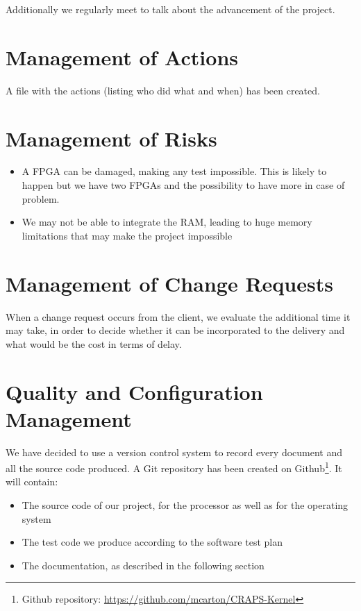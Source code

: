 \documentclass{article}
\begin{document}
    Additionally we regularly meet to talk about the advancement of the project.

  \section{Management of Actions}
    A file with the actions (listing who did what and when) has been created.

  \section{Management of Risks}
    \begin{itemize}
      \item A FPGA can be damaged, making any test impossible. This is likely to
          happen but we have two FPGAs and the possibility to have more in case
          of problem.
      \item We may not be able to integrate the RAM, leading to huge memory
          limitations that may make the project impossible
    \end{itemize}

  \section{Management of Change Requests}
    When a change request occurs from the client, we evaluate the additional
    time it may take, in order to decide whether it can be incorporated to the
    delivery and what would be the cost in terms of delay.

  \section{Quality and Configuration Management}
    We have decided to use a version control system to record every document and
    all the source code produced. A Git repository has been created on
    Github\footnote{Github repository:
    \url{https://github.com/mcarton/CRAPS-Kernel}}.
    It will contain:
    \begin{itemize}
      \item The source code of our project, for the processor as well as for the
            operating system
      \item The test code we produce according to the software test plan
      \item The documentation, as described in the following section
    \end{itemize}
\end{document}
